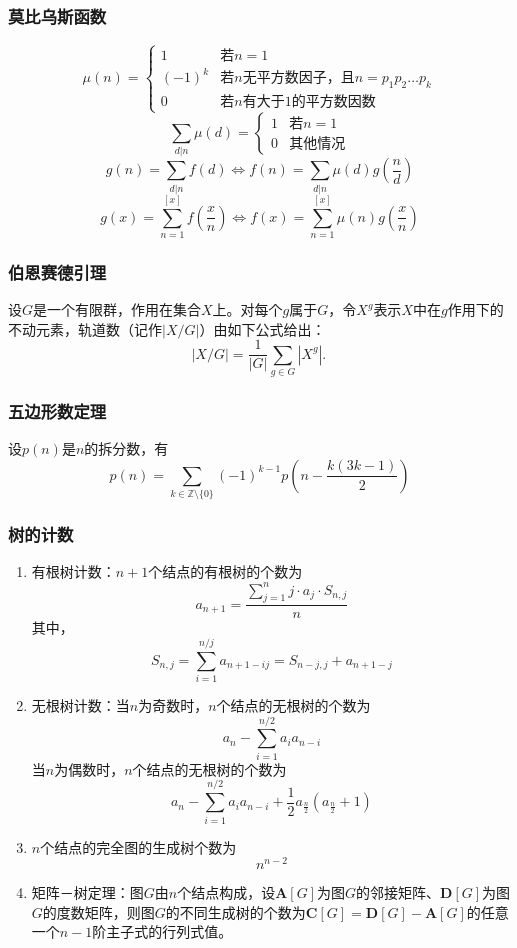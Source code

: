 \documentclass[a4paper]{ctexart}
\begin{document}
\subsubsection{莫比乌斯函数}

$$\mu(n) = \begin{cases}
1 & \text{若}n=1\\
(-1)^k & \text{若}n\text{无平方数因子，且}n = p_1p_2\dots p_k\\
0 & \text{若}n\text{有大于}1\text{的平方数因数}
\end{cases}$$
$$\sum_{d|n}{\mu(d)} = \begin{cases}
1 & \text{若}n=1\\
0 & \text{其他情况}
\end{cases}$$
$$g(n) = \sum_{d|n}{f(d)} \Leftrightarrow f(n) = \sum_{d|n}{\mu(d)g(\frac{n}{d})}$$
$$g(x) = \sum_{n=1}^{[x]}f(\frac{x}{n}) \Leftrightarrow f(x) = \sum_{n=1}^{[x]}{\mu(n)g(\frac{x}{n})}$$

\subsubsection{伯恩赛德引理}
设$G$是一个有限群，作用在集合$X$上。对每个$g$属于$G$，令$X^g$表示$X$中在$g$作用下的不动元素，轨道数（记作$|X/G|$）由如下公式给出：
$$|X/G| = \frac{1}{|G|}\sum_{g \in G}|X^g|.\,$$

\subsubsection{五边形数定理}

设$p(n)$是$n$的拆分数，有$$p(n) = \sum_{k \in \mathbb{Z} \setminus \{0\}} (-1)^{k - 1} p\left(n - \frac{k(3k - 1)}{2}\right)$$

\subsubsection{树的计数}

\begin{enumerate}
	\item 有根树计数：$n+1$个结点的有根树的个数为
	$$a_{n+1} = \frac{\sum_{j=1}^{n}{j \cdot a_j \cdot{S_{n, j}}}}{n}$$
	其中，
	$$S_{n, j} = \sum_{i=1}^{n/j}{a_{n+1-ij}} = S_{n-j, j} + a_{n+1-j}$$
	\item 无根树计数：当$n$为奇数时，$n$个结点的无根树的个数为
	$$a_n-\sum_{i=1}^{n/2}{a_ia_{n-i}}$$
	当$n$为偶数时，$n$个结点的无根树的个数为
	$$a_n-\sum_{i=1}^{n/2}{a_ia_{n-i}}+\frac{1}{2}a_{\frac{n}{2}}(a_{\frac{n}{2}}+1)$$
	\item $n$个结点的完全图的生成树个数为
	$$n^{n-2}$$
	\item 矩阵－树定理：图$G$由$n$个结点构成，设$\bm{A}[G]$为图$G$的邻接矩阵、$\bm{D}[G]$为图$G$的度数矩阵，则图$G$的不同生成树的个数为$\bm{C}[G] = \bm{D}[G] - \bm{A}[G]$的任意一个$n-1$阶主子式的行列式值。
\end{enumerate}
\end{document}
